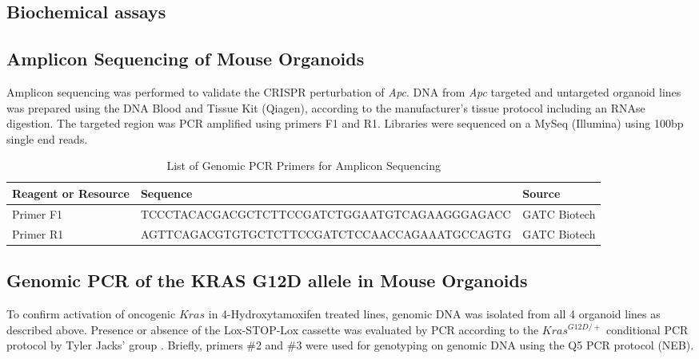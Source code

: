 \begin{flushleft}
\section{Biochemical assays}

\subsection{Amplicon Sequencing of Mouse Organoids}
Amplicon sequencing was performed to validate the CRISPR perturbation of \textit{Apc}. DNA from \textit{Apc} targeted and untargeted organoid lines was prepared using the DNA Blood and Tissue Kit (Qiagen), according to the manufacturer’s tissue protocol including an RNAse digestion. The targeted region was PCR amplified using primers F1 and R1. Libraries were sequenced on a MySeq (Illumina) using 100bp single end reads. 

\begin{table}[htb]
\caption{List of Genomic PCR Primers for Amplicon Sequencing}
\label{tab:oligonucleotides} %
\begin{tabularx}{\textwidth}{XlX}
\toprule
\textbf{Reagent or Resource} & \textbf{Sequence} & \textbf{Source} \\
\midrule
Primer F1 & TCCCTACACGACGCTCTTCCGATCTGGAATGTCAGAAGGGAGACC & GATC Biotech \\
Primer R1 & AGTTCAGACGTGTGCTCTTCCGATCTCCAACCAGAAATGCCAGTG & GATC Biotech \\
\bottomrule
\end{tabularx}
\end{table}

\subsection{Genomic PCR of the KRAS G12D allele in Mouse Organoids}
To confirm activation of oncogenic $Kras$ in 4-Hydroxytamoxifen treated lines, genomic DNA was isolated from all 4 organoid lines as described above. Presence or absence of the Lox-STOP-Lox cassette was evaluated by PCR according to the $Kras^{G12D/+}$ conditional PCR protocol by Tyler Jacks’ group \parencite{jacksonAnalysisLungTumor2001}. Briefly, primers \#2 and \#3 were used for genotyping on genomic DNA using the Q5 PCR protocol (NEB).


\end{flushleft}
